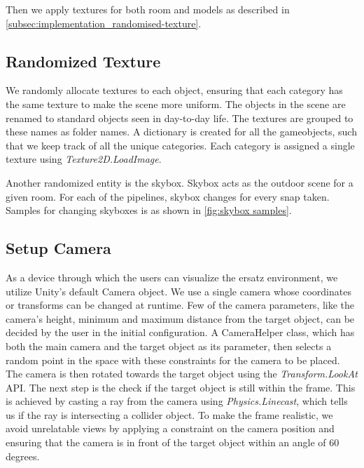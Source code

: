Then we apply textures for both room and models as described in \autoref{subsec:implementation_randomised-texture}.

\subsection{Randomized Texture}\label{subsec:implementation_randomised-texture}
We randomly allocate textures to each object, ensuring that each category has the same texture to make the scene more uniform.
The objects in the scene are renamed to standard objects seen in day-to-day life.
The textures are grouped to these names as folder names.
A dictionary is created for all the gameobjects, such that we keep track of all the unique categories.
Each category is assigned a single texture using \emph{Texture2D.LoadImage}.

Another randomized entity is the skybox.
Skybox acts as the outdoor scene for a given room.
For each of the pipelines, skybox changes for every snap taken.
Samples for changing skyboxes is as shown in \autoref{fig:skybox samples}.

\subsection{Setup Camera}\label{subsec:implementation_camera}
As a device through which the users can visualize the ersatz environment, we utilize Unity's default Camera object.
We use a single camera whose coordinates or transforms can be changed at runtime.
Few of the camera parameters, like the camera's height, minimum and maximum distance from the target object, can be decided by the user in the initial configuration.
A CameraHelper class, which has both the main camera and the target object as its parameter, then selects a random point in the space with these constraints for the camera to be placed.
The camera is then rotated towards the target object using the \emph{Transform.LookAt} API.
The next step is the check if the target object is still within the frame.
This is achieved by casting a ray from the camera using \emph{Physics.Linecast}, which tells us if the ray is intersecting a collider object.
To make the frame realistic, we avoid unrelatable views by applying a constraint on the camera position and ensuring that the camera is in front of the target object within an angle of 60 degrees.

